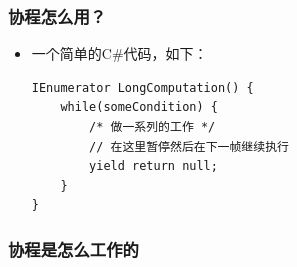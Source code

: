 \documentclass[9pt, b5paper]{article}
\begin{document}
\subsubsection{协程怎么用？}
\label{sec:org2edd002}
\begin{itemize}
\item 一个简单的C\#代码，如下：
\begin{verbatim}
IEnumerator LongComputation() {
    while(someCondition) {
        /* 做一系列的工作 */
        // 在这里暂停然后在下一帧继续执行
        yield return null;
    }
}
\end{verbatim}
\end{itemize}

\subsubsection{协程是怎么工作的}
\label{sec:org4ccdb03}
\end{document}
